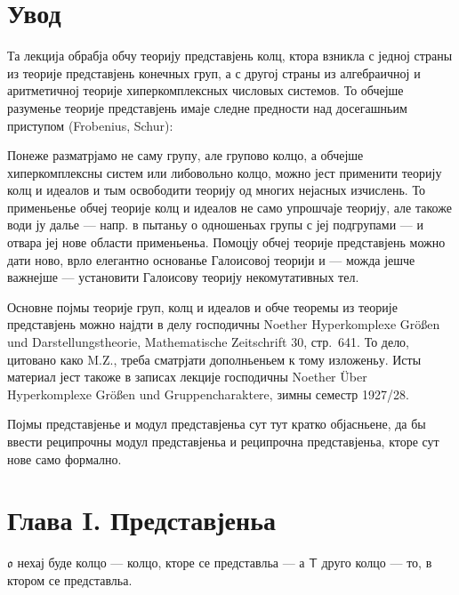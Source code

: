 \documentclass[11pt]{article}
\newcommand{\foreign}[1]{#1}
\begin{document}
\clearpage
\section*{Увод}\label{еинлеитунг}

Та лекција обрабја обчу теорију представјень колц, ктора взникла с
једној страны из теорије представјень конечных груп, а с другој страны
из алгебраичној и аритметичној теорије хиперкомплексных числовых
системов. То обчејше разуменье теорије представјень имаје следне
предности над досегашньим приступом (\foreign{Frobenius},
\foreign{Schur}):

Понеже разматрјамо не саму групу, але групово колцо, а обчејше
хиперкомплексны систем или либовольно колцо, можно јест применити
теорију колц и идеалов и тым освободити теорију од многих нејасных
изчислень. То применьенье обчеј теорије колц и идеалов не само
упрошчаје теорију, але такоже води ју далье --- напр. в пытаньу о
одношеньах групы с јеј подгрупами --- и отвара јеј нове области
применьеньа. Помоцју обчеј теорије представјень можно дати ново, врло
елегантно основанье Галоисовој теорији и --- можда јешче важнејше ---
установити Галоисову теорију некомутативных тел.

Основне појмы теорије груп, колц и идеалов и обче теоремы из теорије
представјень можно најдти в делу господичны \foreign{Noether}
\foreign{Hyperkomplexe Größen und Darstellungstheorie},
\foreign{Mathematische Zeitschrift} 30, стр.~641. То дело, цитовано
како \foreign{M.Z.}, треба сматрјати дополньеньем к тому изложеньу.
Исты материал јест такоже в записах лекције господичны
\foreign{Noether} \foreign{Über Hyperkomplexe Größen und
Gruppencharaktere}, зимны семестр 1927/28.

Појмы представјенье и модул представјеньа сут тут кратко објасньене,
да бы ввести реципрочны модул представјеньа и реципрочна
представјеньа, кторе сут нове само формално.

\section*{Глава I. Представјеньа}\label{капител-и.-дарстеллунген}

$\mathfrak{o}$ нехај буде колцо --- колцо, кторе се представльа --- а
$\mathsf T$ друго колцо --- то, в ктором се представльа.
\end{document}
